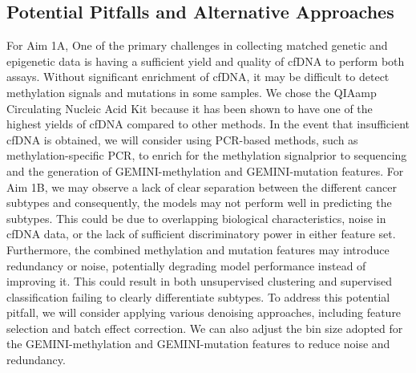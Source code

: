 \documentclass[11pt]{article}
\begin{document}
\subsection*{Potential Pitfalls and Alternative Approaches}
For Aim 1A, One of the primary challenges in collecting matched genetic and epigenetic data is
having a sufficient yield and quality of cfDNA to perform both assays. 
Without significant enrichment of cfDNA, it may be difficult to detect methylation
signals and mutations in some samples. We chose the QIAamp Circulating Nucleic Acid Kit
because it has been shown to have one of the highest yields of cfDNA compared to other
methods. In the event that insufficient cfDNA is obtained, we will consider using
PCR-based methods, such as methylation-specific PCR, to enrich for the methylation signalprior to sequencing and the generation of GEMINI-methylation and GEMINI-mutation features. 
For Aim 1B, we may observe a lack of clear separation between the different cancer subtypes and consequently, the models may not perform well in predicting the subtypes. This could be due to overlapping biological characteristics, noise in cfDNA data, or the lack of sufficient discriminatory power in either feature set. Furthermore, the combined methylation and mutation features may introduce redundancy or noise, potentially degrading model performance instead of improving it. This could result in both unsupervised clustering and supervised classification failing to clearly differentiate subtypes.
To address this potential pitfall, we will consider applying various denoising approaches, including feature selection and batch effect correction. We can also adjust the bin size adopted for the GEMINI-methylation and GEMINI-mutation features to reduce noise and redundancy.
\newpage



\nocite{*}
\end{document}
